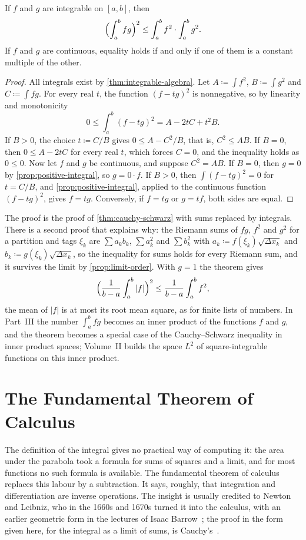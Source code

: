 \begin{theorem}
\label{thm:cauchy-schwarz-integral}
If $f$ and $g$ are integrable on $[a,b]$, then
\[
\Bigl(\int_a^bfg\Bigr)^2\le\int_a^bf^2\cdot\int_a^bg^2 .
\]
If $f$ and $g$ are continuous, equality holds if and only if one of them is a constant multiple of the other.
\end{theorem}

\begin{proof}
All integrals exist by \cref{thm:integrable-algebra}. Let $A\coloneqq\int f^2$, $B\coloneqq\int g^2$ and $C\coloneqq\int fg$. For every real $t$, the function $(f-tg)^2$ is nonnegative, so by linearity and monotonicity
\[
0\le\int_a^b(f-tg)^2=A-2tC+t^2B .
\]
If $B>0$, the choice $t\coloneqq C/B$ gives $0\le A-C^2/B$, that is, $C^2\le AB$. If $B=0$, then $0\le A-2tC$ for every real $t$, which forces $C=0$, and the inequality holds as $0\le0$. Now let $f$ and $g$ be continuous, and suppose $C^2=AB$. If $B=0$, then $g=0$ by \cref{prop:positive-integral}, so $g=0\cdot f$. If $B>0$, then $\int(f-tg)^2=0$ for $t=C/B$, and \cref{prop:positive-integral}, applied to the continuous function $(f-tg)^2$, gives $f=tg$. Conversely, if $f=tg$ or $g=tf$, both sides are equal.
\end{proof}

The proof is the proof of \cref{thm:cauchy-schwarz} with sums replaced by integrals. There is a second proof that explains why: the Riemann sums of $fg$, $f^2$ and $g^2$ for a partition and tags $\xi_k$ are $\sum a_kb_k$, $\sum a_k^2$ and $\sum b_k^2$ with $a_k\coloneqq f(\xi_k)\sqrt{\Delta x_k}$ and $b_k\coloneqq g(\xi_k)\sqrt{\Delta x_k}$, so the inequality for sums holds for every Riemann sum, and it survives the limit by \cref{prop:limit-order}. With $g=1$ the theorem gives
\[
\Bigl(\frac1{b-a}\int_a^b|f|\Bigr)^2\le\frac1{b-a}\int_a^bf^2 ,
\]
the mean of $|f|$ is at most its root mean square, as for finite lists of numbers. In Part~III the number $\int_a^bfg$ becomes an inner product of the functions $f$ and $g$, and the theorem becomes a special case of the Cauchy--Schwarz inequality in inner product spaces; Volume~II builds the space $L^2$ of square-integrable functions on this inner product.

\section{The Fundamental Theorem of Calculus}
\label{sec:ftc}

The definition of the integral gives no practical way of computing it: the area under the parabola took a formula for sums of squares and a limit, and for most functions no such formula is available. The fundamental theorem of calculus replaces this labour by a subtraction. It says, roughly, that integration and differentiation are inverse operations. The insight is usually credited to Newton and Leibniz, who in the 1660s and 1670s turned it into the calculus, with an earlier geometric form in the lectures of Isaac Barrow~\cite{edwards1979}; the proof in the form given here, for the integral as a limit of sums, is Cauchy's~\cite{cauchy1823,grabiner1981}.

